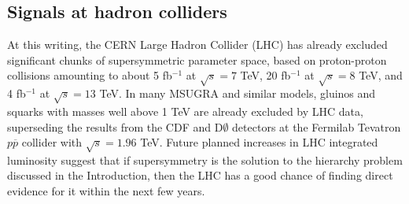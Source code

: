 \documentclass[12pt]{article}
\begin{document}
\subsection{Signals at hadron colliders}\label{subsec:signals.TEVLHC}
\setcounter{equation}{0}
\setcounter{footnote}{1}

At this writing, the CERN Large Hadron Collider (LHC) 
has already excluded significant chunks of supersymmetric parameter space,
based on proton-proton collisions amounting to about 5 fb$^{-1}$ at $\sqrt{s} = 7$ TeV,
20 fb$^{-1}$ at $\sqrt{s} = 8$ TeV, and 4 fb$^{-1}$ at $\sqrt{s} = 13$ TeV.
In many MSUGRA and similar models, gluinos and
squarks with masses well above 1 TeV are already excluded by LHC data, 
superseding the results
from the CDF and D$\emptyset$ detectors at the 
Fermilab Tevatron $p\overline p$ 
collider with $\sqrt{s} = 1.96$ TeV. 
Future planned increases in LHC integrated luminosity suggest that 
if supersymmetry is the solution to the hierarchy problem 
discussed in the Introduction, then the LHC 
has a good chance of finding direct evidence for it within the next few years.
\end{document}

